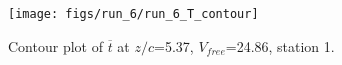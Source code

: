 \begin{figure}[H]
\centering
\texttt{[image: figs/run\_6/run\_6\_T\_contour]}
\caption{Contour plot of $\overline{t}$ at $z/c$=5.37, $V_{free}$=24.86, station 1.}
\label{fig:run_6_T_contour}
\end{figure}


